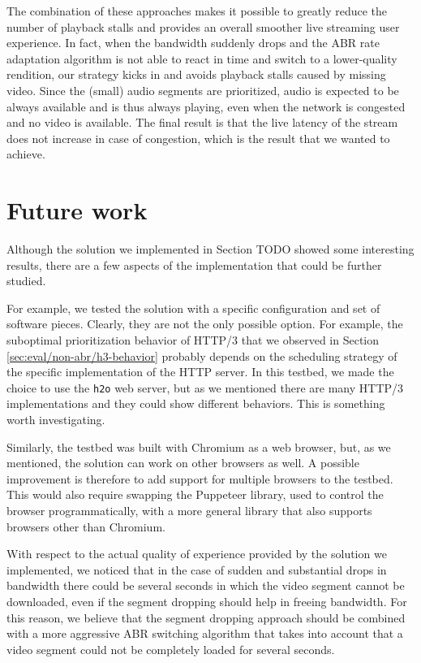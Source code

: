 The combination of these approaches makes it possible to greatly reduce the number of playback stalls and provides an overall smoother live streaming user experience. In fact, when the bandwidth suddenly drops and the ABR rate adaptation algorithm is not able to react in time and switch to a lower-quality rendition, our strategy kicks in and avoids playback stalls caused by missing video. Since the (small) audio segments are prioritized, audio is expected to be always available and is thus always playing, even when the network is congested and no video is available. The final result is that the live latency of the stream does not increase in case of congestion, which is the result that we wanted to achieve.

\section{Future work}
\label{sec:conclusions/future}

Although the solution we implemented in Section TODO showed some interesting results, there are a few aspects of the implementation that could be further studied.

For example, we tested the solution with a specific configuration and set of software pieces. Clearly, they are not the only possible option. For example, the suboptimal prioritization behavior of HTTP/3 that we observed in Section \ref{sec:eval/non-abr/h3-behavior} probably depends on the scheduling strategy of the specific implementation of the HTTP server. In this testbed, we made the choice to use the \texttt{h2o} web server, but as we mentioned there are many HTTP/3 implementations and they could show different behaviors. This is something worth investigating.

Similarly, the testbed was built with Chromium as a web browser, but, as we mentioned, the solution can work on other browsers as well. A possible improvement is therefore to add support for multiple browsers to the testbed. This would also require swapping the Puppeteer library, used to control the browser programmatically, with a more general library that also supports browsers other than Chromium.

With respect to the actual quality of experience provided by the solution we implemented, we noticed that in the case of sudden and substantial drops in bandwidth there could be several seconds in which the video segment cannot be downloaded, even if the segment dropping should help in freeing bandwidth. For this reason, we believe that the segment dropping approach should be combined with a more aggressive ABR switching algorithm that takes into account that a video segment could not be completely loaded for several seconds.

